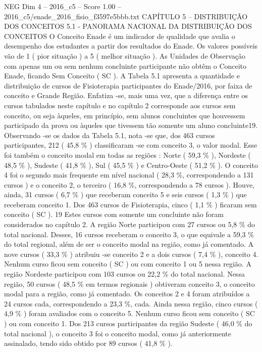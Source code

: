 \begin{textsample}{NEG Dim 4 – 2016\_c5 – Score 1.00 – 2016\_c5/enade\_2016\_fisio\_f3597e5bbb.txt}  \label{ex:f4_neg_251}
CAPÍTULO 5 – DISTRIBUIÇÃO DOS CONCEITOS 5.1 - PANORAMA NACIONAL DA DISTRIBUIÇÃO DOS CONCEITOS O Conceito Enade é um indicador de qualidade que avalia o desempenho dos estudantes a partir dos resultados do Enade.
Os valores possíveis vão de 1 ( pior situação ) a 5 ( melhor situação ).
As Unidades de Observação com apenas um ou sem nenhum concluinte participante não obtêm o Conceito Enade, ficando Sem Conceito ( SC ).
A Tabela 5.1 apresenta a quantidade e distribuição de cursos de Fisioterapia participantes do Enade/2016, por faixa de conceito e Grande Região.
Enfatiza -se, mais uma vez, que a diferença entre os cursos tabulados neste capítulo e no capítulo 2 corresponde aos cursos sem conceito, ou seja àqueles, em princípio, sem alunos concluintes que houvessem participado da prova ou àqueles que tivessem tão somente um aluno concluinte19.
Observando -se os dados da Tabela 5.1, nota -se que, dos 463 cursos participantes, 212 ( 45,8 \% ) classificaram -se com conceito 3, o valor modal.
Esse foi também o conceito modal em todas as regiões : Norte ( 59,3 \% ), Nordeste ( 48,5 \% ), Sudeste ( 41,8 \% ), Sul ( 45,5 \% ) e Centro-Oeste ( 51,2 \% ).
O conceito 4 foi o segundo mais frequente em nível nacional ( 28,3 \%, correspondendo a 131 cursos ) e o conceito 2, o terceiro ( 16,8 \%, correspondendo a 78 cursos ).
Houve, ainda, 31 cursos ( 6,7 \% ) que receberam conceito 5 e seis cursos ( 1,3 \% ) que receberam conceito 1.
Dos 463 cursos de Fisioterapia, cinco ( 1,1 \% ) ficaram sem conceito ( SC ). 19 Estes cursos com somente um concluinte não foram considerados no capítulo 2.
A região Norte participou com 27 cursos ou 5,8 \% do total nacional.
Desses, 16 cursos receberam o conceito 3, o que equivale a 59,3 \% do total regional, além de ser o conceito modal na região, como já comentado.
A nove cursos ( 33,3 \% ) atribuiu -se conceito 2 e a dois cursos ( 7,4 \% ), conceito 4.
Nenhum curso ficou sem conceito ( SC ) ou com conceito 1 ou 5 nessa região.
A região Nordeste participou com 103 cursos ou 22,2 \% do total nacional.
Nessa região, 50 cursos ( 48,5 \% em termos regionais ) obtiveram conceito 3, o conceito modal para a região, como já comentado.
Os conceitos 2 e 4 foram atribuídos a 24 cursos cada, correspondendo a 23,3 \%, cada.
Ainda nessa região, cinco cursos ( 4,9 \% ) foram avaliados com o conceito 5.
Nenhum curso ficou sem conceito ( SC ) ou com conceito 1.
Dos 213 cursos participantes da região Sudeste ( 46,0 \% do total nacional ), o conceito 3 foi o conceito modal, como já anteriormente assinalado, tendo sido obtido por 89 cursos ( 41,8 \% ).

\end{textsample}
